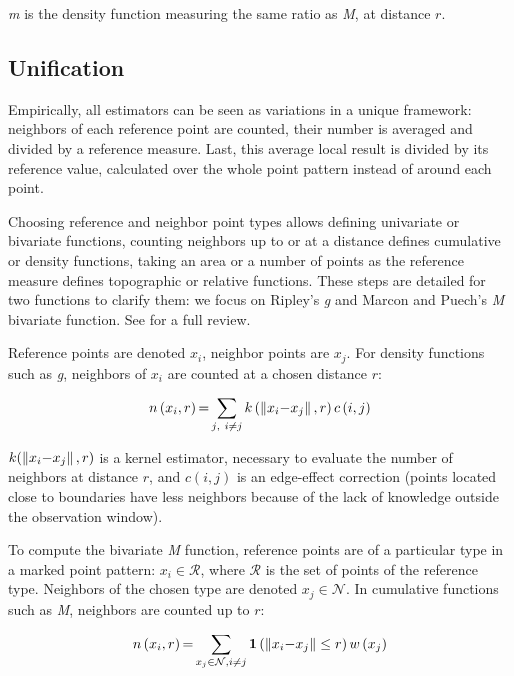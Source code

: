 \documentclass[nojss]{jss}
\begin{document}
\emph{m} \citep{Lang2014} is the density function measuring the same ratio as \emph{M}, at distance $r$.


\subsection{Unification}
Empirically, all estimators can be seen as variations in a unique framework: neighbors of each reference point are counted, their number is averaged and divided by a reference measure. Last, this average local result is divided by its reference value, calculated over the whole point pattern instead of around each point.

Choosing reference and neighbor point types allows defining univariate or bivariate functions, counting neighbors up to or at a distance defines cumulative or density functions, taking an area or a number of points as the reference measure defines topographic or relative functions. These steps are detailed for two functions to clarify them: we focus on Ripley's \emph{g} and Marcon and Puech's \emph{M} bivariate function. See \cite{Marcon2012a} for a full review.

Reference points are denoted $x_i$, neighbor points are $x_j$. For density functions such as \emph{g}, neighbors of $x_i$ are counted at a chosen distance $r$:

\begin{equation}
   n\left(x_i,r\right){\rm =}\sum_{j{\rm ,\ }i\ne j}{k\left(\left\|x_i{\rm -}x_j\right\|,r\right)c\left(i,j\right)}
\end{equation}

$k(\left\|x_i{\rm -}x_j\right\|,r)$ is a kernel estimator, necessary to evaluate the number of neighbors at distance $r$, and $c(i,j)$ is an edge-effect correction (points located close to boundaries have less neighbors because of the lack of knowledge outside the observation window).

To compute the bivariate \emph{M} function, reference points are of a particular type in a marked point pattern: $x_i \in \mathcal{R}$, where $\mathcal{R}$ is the set of points of the reference type. Neighbors of the chosen type are denoted $x_j \in \mathcal{N}$. In cumulative functions such as \emph{M}, neighbors are counted up to $r$:

\begin{equation}
   n\left(x_i,r\right){\rm =}\sum_{x_j \in \mathcal{N}, i \ne j}{{\mathbf 1}\left(\left\|x_i{\rm -}x_j\right\|\le r\right)w\left(x_j\right)}
\end{equation}
\end{document}
